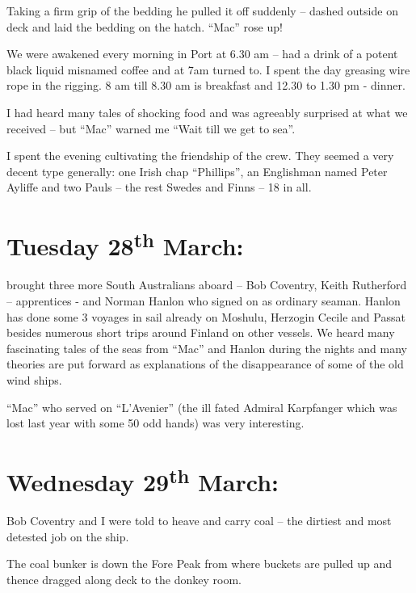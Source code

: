 \documentclass[
  11pt,
  msmallroyalvopaper
]{memoir}
\begin{document}
Taking a firm grip of the bedding he pulled it off suddenly -- dashed
outside on deck and laid the bedding on the hatch. ``Mac'' rose up!

We were awakened every morning in Port at 6.30 am -- had a drink of a
potent black liquid misnamed coffee and at 7am turned to. I spent the
day greasing wire rope in the rigging. 8 am till 8.30 am is breakfast
and 12.30 to 1.30 pm - dinner.

I had heard many tales of shocking food and was agreeably surprised at
what we received -- but ``Mac'' warned me ``Wait till we get to sea''.

I spent the evening cultivating the friendship of the crew. They seemed
a very decent type generally: one Irish chap ``Phillips'', an Englishman
named Peter Ayliffe and two Pauls -- the rest Swedes and Finns -- 18 in
all.

\hypertarget{tuesday-28th-march}{%
\section{\texorpdfstring{Tuesday 28\textsuperscript{th}
March:}{Tuesday 28th March:}}\label{tuesday-28th-march}}

brought three more South Australians aboard -- Bob Coventry, Keith
Rutherford -- apprentices - and Norman Hanlon who signed on as ordinary
seaman. Hanlon has done some 3 voyages in sail already on Moshulu,
Herzogin Cecile and Passat besides numerous short trips around Finland
on other vessels. We heard many fascinating tales of the seas from
``Mac'' and Hanlon during the nights and many theories are put forward
as explanations of the disappearance of some of the old wind ships.

``Mac'' who served on ``L'Avenier'' (the ill fated Admiral Karpfanger
which was lost last year with some 50 odd hands) was very interesting.

\hypertarget{wednesday-29th-march}{%
\section{\texorpdfstring{Wednesday 29\textsuperscript{th}
March:}{Wednesday 29th March:}}\label{wednesday-29th-march}}

Bob Coventry and I were told to heave and carry coal -- the dirtiest and
most detested job on the ship.

The coal bunker is down the Fore Peak from where buckets are pulled up
and thence dragged along deck to the donkey room.
\end{document}
